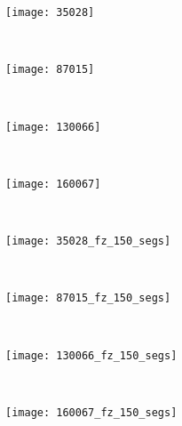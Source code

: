 \begin{figure}[!ht]
    \centering
    \begin{subfigure}[t]{\textwidth+20pt\relax}
    	\texttt{[image: 35028]} 
    \end{subfigure}      
    ~ %
    \begin{subfigure}[b]{0.2\textwidth}
        \texttt{[image: 87015]}
    \end{subfigure}
    ~ %
    \begin{subfigure}[b]{0.2\textwidth}
        \texttt{[image: 130066]}
    \end{subfigure}
    ~ %
    \begin{subfigure}[b]{0.2\textwidth}
        \texttt{[image: 160067]}
    \end{subfigure} \\[2ex]       
    
    \begin{subfigure}[t]{\textwidth+20pt\relax}
    	\texttt{[image: 35028\_fz\_150\_segs]} 
    \end{subfigure}      
    ~ %
    \begin{subfigure}[b]{0.2\textwidth}
        \texttt{[image: 87015\_fz\_150\_segs]}
    \end{subfigure}
    ~ %
    \begin{subfigure}[b]{0.2\textwidth}
        \texttt{[image: 130066\_fz\_150\_segs]}
    \end{subfigure}
    ~ %
    \begin{subfigure}[b]{0.2\textwidth}
        \texttt{[image: 160067\_fz\_150\_segs]}
    \end{subfigure} \\ [2ex]
    

\end{figure}
